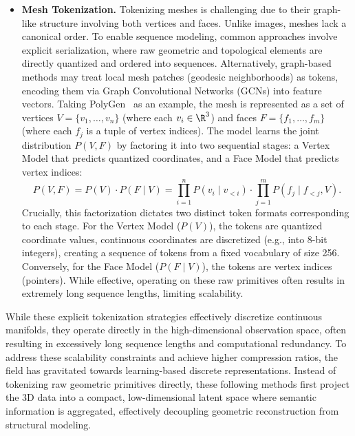 \documentclass[../../book-main.tex]{subfiles}
\begin{document}
\begin{itemize}
\item \textbf{Mesh Tokenization.} 
Tokenizing meshes is challenging due to their graph-like structure involving both vertices and faces.
Unlike images, meshes lack a canonical order. To enable sequence modeling, common approaches involve
explicit serialization, where raw geometric and topological elements are directly quantized and ordered into sequences.
Alternatively, graph-based methods may treat local mesh patches (geodesic neighborhoods) as tokens, encoding them via Graph Convolutional Networks (GCNs) into feature vectors.
Taking PolyGen~\citep{nash2020polygen} as an example, the mesh is represented as a set of 
vertices \(V = \{v_1, \dots, v_n\}\) (where each \(v_i \in \R^3\)) and faces 
\(F = \{f_1, \dots, f_m\}\) (where each \(f_j\) is a tuple of vertex indices).
The model learns the joint distribution \(P(V, F)\) by factoring it into two sequential stages: 
a Vertex Model that predicts quantized coordinates, and a Face Model that predicts vertex indices:
\begin{equation}
    P(V, F) = P(V) \cdot P(F \mid V) = \prod_{i=1}^{n} P(v_i \mid v_{<i}) \cdot \prod_{j=1}^{m} P(f_j \mid f_{<j}, V) .
\end{equation}
Crucially, this factorization dictates two distinct token formats corresponding to each stage.
For the Vertex Model (\(P(V)\)), the tokens are quantized coordinate values, 
continuous coordinates are discretized (e.g., into 8-bit integers), 
creating a sequence of tokens from a fixed vocabulary of size 256. 
Conversely, for the Face Model (\(P(F \mid V)\)), the tokens are vertex indices (pointers).
While effective, operating on these raw primitives often results in extremely long sequence lengths, limiting scalability.
\end{itemize}

While these explicit tokenization strategies effectively discretize 
continuous manifolds, they operate directly in the high-dimensional 
observation space, often resulting in excessively long sequence lengths 
and computational redundancy.
To address these scalability constraints 
and achieve higher compression ratios, the field has gravitated towards 
learning-based discrete representations.
Instead of tokenizing raw 
geometric primitives directly, these following methods first project the 3D data 
into a compact, low-dimensional latent space where semantic information 
is aggregated, effectively decoupling geometric reconstruction from structural modeling.
\end{document}
